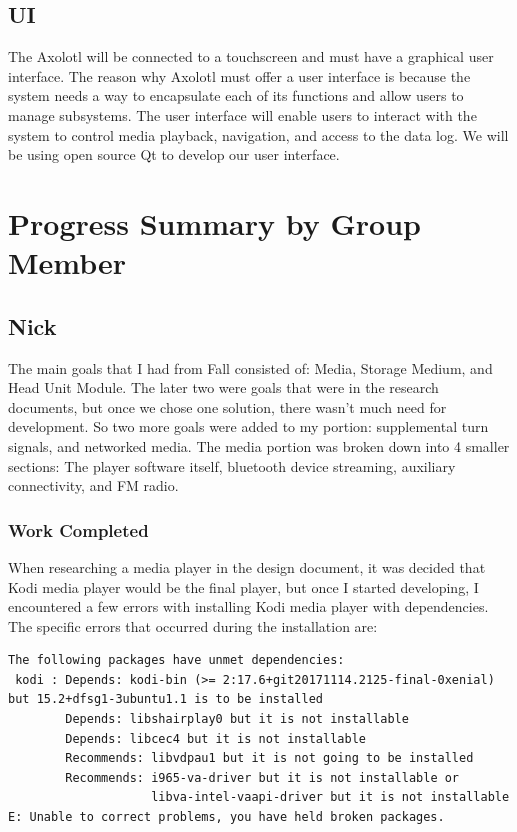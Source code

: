 \documentclass[onecolumn, draftclsnofoot,10pt, compsoc]{IEEEtran}
\begin{document}
\subsection{UI}
The Axolotl will be connected to a touchscreen and must have a graphical user interface. The reason why Axolotl must offer a user interface is because the system needs a way to encapsulate each of its functions and allow users to manage subsystems. The user interface will enable users to interact with the system to control media playback, navigation, and access to the data log. We will be using open source Qt to develop our user interface. 

\newpage
\section{Progress Summary by Group Member}
\subsection{Nick}
The main goals that I had from Fall consisted of: Media, Storage Medium, and Head Unit Module. The later two were goals that were in the research documents, but once we chose one solution, there wasn't much need for development. So two more goals were added to my portion: supplemental turn signals, and networked media. The media portion was broken down into 4 smaller sections: The player software itself, bluetooth device streaming, auxiliary connectivity, and FM radio.\par

\subsubsection{Work Completed}
When researching a media player in the design document, it was decided that Kodi media player would be the final player, but once I started developing, I encountered a few errors with installing Kodi media player with dependencies. The specific errors that occurred during the installation are:\par

\begin{verbatim}
The following packages have unmet dependencies:
 kodi : Depends: kodi-bin (>= 2:17.6+git20171114.2125-final-0xenial) but 15.2+dfsg1-3ubuntu1.1 is to be installed
        Depends: libshairplay0 but it is not installable
        Depends: libcec4 but it is not installable
        Recommends: libvdpau1 but it is not going to be installed
        Recommends: i965-va-driver but it is not installable or
                    libva-intel-vaapi-driver but it is not installable
E: Unable to correct problems, you have held broken packages.
\end{verbatim}
\end{document}
